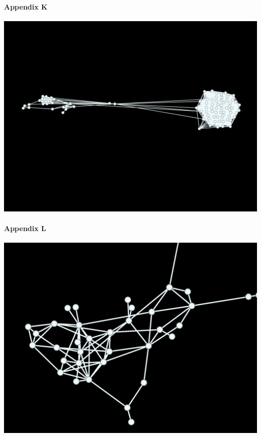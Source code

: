 \documentclass[11pt,twocolumn]{article}
\begin{document}
\paragraph{Appendix K\newline\newline\newline\newline\newline}
\includegraphics[scale=0.22]{eigenvectorcentraility_tv.png}
\paragraph{{\newline\newline\newline\newline}Appendix L\newline\newline\newline\newline\newline}
\includegraphics[scale=0.21]{eigenvectorcentraility_com.png}
\end{document}
